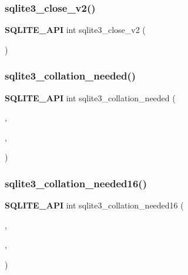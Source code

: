 \mbox{\label{sqlite3_8h_ad2cb8462eaba28b4c8410ef55a4282b4}} 
\subsubsection{sqlite3\_close\_v2()}
{\footnotesize\ttfamily \textbf{ S\+Q\+L\+I\+T\+E\+\_\+\+A\+PI} int sqlite3\+\_\+close\+\_\+v2 (\begin{DoxyParamCaption}\item[{\textbf{ sqlite3} $\ast$}]{ }\end{DoxyParamCaption})}

\mbox{\label{sqlite3_8h_afafab80c89fd08e6b0dd9fd43cb4cd11}} 
\subsubsection{sqlite3\_collation\_needed()}
{\footnotesize\ttfamily \textbf{ S\+Q\+L\+I\+T\+E\+\_\+\+A\+PI} int sqlite3\+\_\+collation\+\_\+needed (\begin{DoxyParamCaption}\item[{\textbf{ sqlite3} $\ast$}]{,  }\item[{void $\ast$}]{,  }\item[{void($\ast$)(void $\ast$, \textbf{ sqlite3} $\ast$, int e\+Text\+Rep, const char $\ast$)}]{ }\end{DoxyParamCaption})}

\mbox{\label{sqlite3_8h_a91bb2f0e903df03392d706dc3380910d}} 
\subsubsection{sqlite3\_collation\_needed16()}
{\footnotesize\ttfamily \textbf{ S\+Q\+L\+I\+T\+E\+\_\+\+A\+PI} int sqlite3\+\_\+collation\+\_\+needed16 (\begin{DoxyParamCaption}\item[{\textbf{ sqlite3} $\ast$}]{,  }\item[{void $\ast$}]{,  }\item[{void($\ast$)(void $\ast$, \textbf{ sqlite3} $\ast$, int e\+Text\+Rep, const void $\ast$)}]{ }\end{DoxyParamCaption})}

